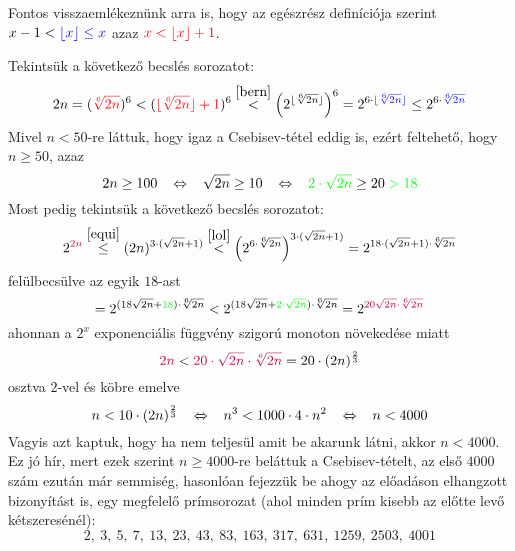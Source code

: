 \documentclass[12pt]{book}
\theoremstyle{plain} %
\theoremstyle{definition} %
\theoremstyle{remark}
\numberwithin{equation}{section}  %
\begin{document}
	Fontos visszaemlékeznünk arra is, hogy az egészrész definíciója szerint $x - 1 < \color{blue} \lfloor x \rfloor \leq x \color{black}$ azaz $\color{red} x<\lfloor x \rfloor + 1 \color{black}$.
	
	Tekintsük a következő becslés sorozatot:
	\begin{equation}\label{lol}
		 2n = (\color{red}\sqrt[6]{2n}\color{black})^6 < (\color{red} \lfloor \sqrt[6]{2n} \rfloor + 1 \color{black})^6 \stackrel{\ref{bern}}{<} \left(2^{\lfloor \sqrt[6]{2n} \rfloor}\right)^6 = 2^{6\cdot \color{blue} \lfloor \sqrt[6]{2n} \rfloor \color{black} } \leq 2^{6\cdot \color{blue} \sqrt[6]{2n} \color{black} }
	\end{equation}
	Mivel $n< 50$-re láttuk, hogy igaz a Csebisev-tétel eddig is, ezért feltehető, hogy $n\geq 50$, azaz
	\[ 2n\geq 100 \hspace{3mm} \Leftrightarrow \hspace{3mm} \sqrt{2n} \geq 10 \hspace{3mm} \Leftrightarrow \hspace{3mm} \color{green}2\cdot \sqrt{2n}\color{black} \geq 20 \color{green}> 18\color{black}   \]
	Most pedig tekintsük a következő becslés sorozatot:
	\[ 2^{\color{purple}2n\color{black}} \stackrel{\ref{equi}}{\leq} (2n)^{3\cdot (\sqrt{2n} + 1)} \stackrel{\ref{lol}}{<} \left(2^{6\cdot \sqrt[6]{2n}}\right)^{3\cdot (\sqrt{2n}+1)} = 2^{18 \cdot (\sqrt{2n}+1)\cdot \sqrt[6]{2n}}  \]
	felülbecsülve az egyik $18$-ast
	\[= 2^{(18 \sqrt{2n}+\color{green}18\color{black})\cdot \sqrt[6]{2n}} <  2^{(18\sqrt{2n} + \color{green}2\cdot \sqrt{2n}\color{black})\cdot \sqrt[6]{2n}} = 2^{\color{purple}20\sqrt{2n}\cdot \sqrt[6]{2n}\color{black}}  \]
	ahonnan a $2^x$ exponenciális függvény szigorú monoton növekedése miatt
	\[ \color{purple} 2n \color{black} < \color{purple} 20\cdot \sqrt{2n} \cdot \sqrt[6]{2n} \color{black} = 20\cdot (2n)^{\frac{2}{3}} \]
	osztva $2$-vel és köbre emelve
	\[ n < 10\cdot (2n)^{\frac{2}{3}} \hspace{3mm} \Leftrightarrow \hspace{3mm} n^3 < 1000 \cdot 4 \cdot n^2 \hspace{3mm} \Leftrightarrow \hspace{3mm} n < 4000  \]
	Vagyis azt kaptuk, hogy ha nem teljesül amit be akarunk látni, akkor $n<4000$. Ez jó hír, mert ezek szerint $n\geq 4000$-re beláttuk a Csebisev-tételt, az első $4000$ szám ezután már semmiség, hasonlóan fejezzük be ahogy az előadáson elhangzott bizonyítást is, egy megfelelő prímsorozat (ahol minden prím kisebb az előtte levő kétszeresénél):
	\[ 2,\ 3,\ 5,\ 7,\ 13,\ 23,\ 43,\ 83,\ 163,\ 317,\ 631,\ 1259,\ 2503,\ 4001  \]
	

	
	\begin{comment}
		\begin{figure}[h] %
		\centering
		\texttt{[image: cimer.jpg]}
		\caption{A kép címe}\label{elsokep}
		\end{figure}
	\end{comment}
	
\end{document}
